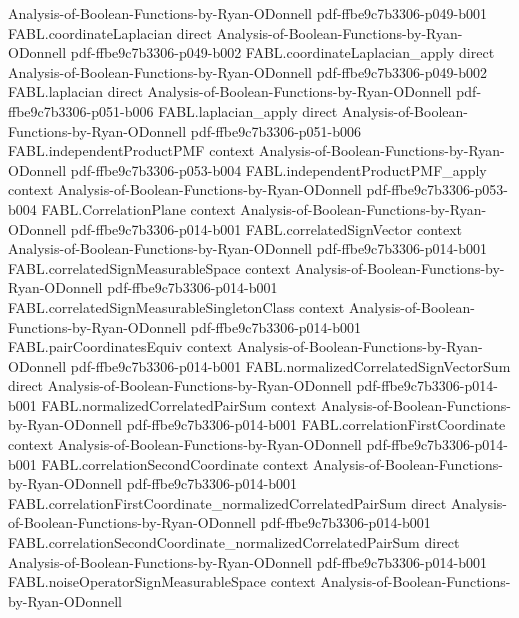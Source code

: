 \begin{theorem}
  {Analysis-of-Boolean-Functions-by-Ryan-ODonnell}
  {pdf-ffbe9c7b3306-p049-b001}
\proofstep
  {FABL.coordinateLaplacian}
  {direct}
  {Analysis-of-Boolean-Functions-by-Ryan-ODonnell}
  {pdf-ffbe9c7b3306-p049-b002}
\proofstep
  {FABL.coordinateLaplacian_apply}
  {direct}
  {Analysis-of-Boolean-Functions-by-Ryan-ODonnell}
  {pdf-ffbe9c7b3306-p049-b002}
\proofstep
  {FABL.laplacian}
  {direct}
  {Analysis-of-Boolean-Functions-by-Ryan-ODonnell}
  {pdf-ffbe9c7b3306-p051-b006}
\proofstep
  {FABL.laplacian_apply}
  {direct}
  {Analysis-of-Boolean-Functions-by-Ryan-ODonnell}
  {pdf-ffbe9c7b3306-p051-b006}
\proofstep
  {FABL.independentProductPMF}
  {context}
  {Analysis-of-Boolean-Functions-by-Ryan-ODonnell}
  {pdf-ffbe9c7b3306-p053-b004}
\proofstep
  {FABL.independentProductPMF_apply}
  {context}
  {Analysis-of-Boolean-Functions-by-Ryan-ODonnell}
  {pdf-ffbe9c7b3306-p053-b004}
\proofstep
  {FABL.CorrelationPlane}
  {context}
  {Analysis-of-Boolean-Functions-by-Ryan-ODonnell}
  {pdf-ffbe9c7b3306-p014-b001}
\proofstep
  {FABL.correlatedSignVector}
  {context}
  {Analysis-of-Boolean-Functions-by-Ryan-ODonnell}
  {pdf-ffbe9c7b3306-p014-b001}
\proofstep
  {FABL.correlatedSignMeasurableSpace}
  {context}
  {Analysis-of-Boolean-Functions-by-Ryan-ODonnell}
  {pdf-ffbe9c7b3306-p014-b001}
\proofstep
  {FABL.correlatedSignMeasurableSingletonClass}
  {context}
  {Analysis-of-Boolean-Functions-by-Ryan-ODonnell}
  {pdf-ffbe9c7b3306-p014-b001}
\proofstep
  {FABL.pairCoordinatesEquiv}
  {context}
  {Analysis-of-Boolean-Functions-by-Ryan-ODonnell}
  {pdf-ffbe9c7b3306-p014-b001}
\proofstep
  {FABL.normalizedCorrelatedSignVectorSum}
  {direct}
  {Analysis-of-Boolean-Functions-by-Ryan-ODonnell}
  {pdf-ffbe9c7b3306-p014-b001}
\proofstep
  {FABL.normalizedCorrelatedPairSum}
  {context}
  {Analysis-of-Boolean-Functions-by-Ryan-ODonnell}
  {pdf-ffbe9c7b3306-p014-b001}
\proofstep
  {FABL.correlationFirstCoordinate}
  {context}
  {Analysis-of-Boolean-Functions-by-Ryan-ODonnell}
  {pdf-ffbe9c7b3306-p014-b001}
\proofstep
  {FABL.correlationSecondCoordinate}
  {context}
  {Analysis-of-Boolean-Functions-by-Ryan-ODonnell}
  {pdf-ffbe9c7b3306-p014-b001}
\proofstep
  {FABL.correlationFirstCoordinate_normalizedCorrelatedPairSum}
  {direct}
  {Analysis-of-Boolean-Functions-by-Ryan-ODonnell}
  {pdf-ffbe9c7b3306-p014-b001}
\proofstep
  {FABL.correlationSecondCoordinate_normalizedCorrelatedPairSum}
  {direct}
  {Analysis-of-Boolean-Functions-by-Ryan-ODonnell}
  {pdf-ffbe9c7b3306-p014-b001}
\proofstep
  {FABL.noiseOperatorSignMeasurableSpace}
  {context}
  {Analysis-of-Boolean-Functions-by-Ryan-ODonnell}

\end{theorem}

